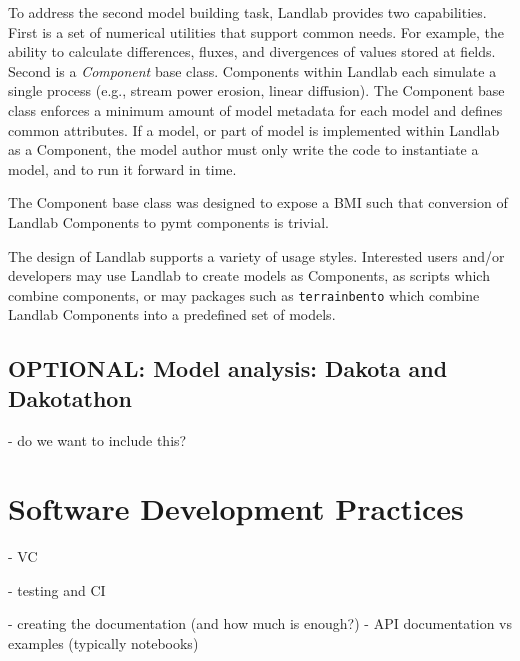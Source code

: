 \documentclass[12pt]{amsart}
\begin{document}
To address the second model building task, Landlab provides two capabilities. First is a set of numerical utilities that support common needs. For example, the ability to calculate differences, fluxes, and divergences of values stored at fields. Second is a \textit{Component} base class. Components within Landlab each simulate a single process (e.g., stream power erosion, linear diffusion). The Component base class enforces a minimum amount of model metadata for each model and defines common attributes. If a model, or part of model is implemented within Landlab as a Component, the model author must only write the code to instantiate a model, and to run it forward in time. 

The Component base class was designed to expose a BMI such that conversion of Landlab Components to pymt components is trivial. 

The design of Landlab supports a variety of usage styles. Interested users and/or developers may use Landlab to create models as Components, as scripts which combine components, or may packages such as \texttt{terrainbento} \citep{barnhart2019terrainbento} which combine Landlab Components into a predefined set of models.





\subsection{OPTIONAL: Model analysis: Dakota and Dakotathon}

- do we want to include this?

\section{Software Development Practices}

- VC

- testing and CI

- creating the documentation (and how much is enough?)
   - API documentation vs examples (typically notebooks)
\end{document}
